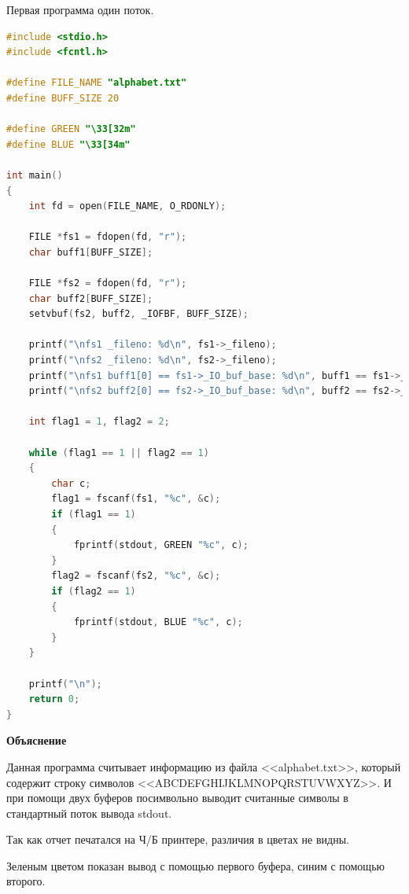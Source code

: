 \documentclass[a4paper,oneside,12pt]{extreport}
\begin{document}
\begin{task}
    Первая программа один поток.
    \begin{lstlisting}[language=C]
#include <stdio.h>
#include <fcntl.h>

#define FILE_NAME "alphabet.txt"
#define BUFF_SIZE 20

#define GREEN "\33[32m"
#define BLUE "\33[34m"

int main()
{
	int fd = open(FILE_NAME, O_RDONLY); 
	
	FILE *fs1 = fdopen(fd, "r");
	char buff1[BUFF_SIZE];
	
	FILE *fs2 = fdopen(fd, "r");
	char buff2[BUFF_SIZE];
	setvbuf(fs2, buff2, _IOFBF, BUFF_SIZE);
	
	printf("\nfs1 _fileno: %d\n", fs1->_fileno);
	printf("\nfs2 _fileno: %d\n", fs2->_fileno);
	printf("\nfs1 buff1[0] == fs1->_IO_buf_base: %d\n", buff1 == fs1->_IO_buf_base);
	printf("\nfs2 buff2[0] == fs2->_IO_buf_base: %d\n", buff2 == fs2->_IO_buf_base);
	
	int flag1 = 1, flag2 = 2;

	while (flag1 == 1 || flag2 == 1)
	{
		char c;
		flag1 = fscanf(fs1, "%c", &c);
		if (flag1 == 1)
		{
			fprintf(stdout, GREEN "%c", c);
		}
		flag2 = fscanf(fs2, "%c", &c);
		if (flag2 == 1)
		{
			fprintf(stdout, BLUE "%c", c);
		}
	}
	
	printf("\n");
	return 0;
}
    \end{lstlisting}


    \begin{center}
        \textbf{Объяснение}        
    \end{center}

    Данная программа считывает информацию из файла <<alphabet.txt>>, который содержит строку символов <<ABCDEFGHIJKLMNOPQRSTUVWXYZ>>.
    И при помощи двух буферов посимвольно выводит считанные символы в стандартный поток вывода stdout.  

    Так как отчет печатался на Ч/Б принтере, различия в цветах не видны.
    
    Зеленым цветом показан вывод с помощью первого буфера, синим с помощью второго.
 
    \begin{figure}[ht!]
    \end{figure}
    


\end{task}
\end{document}
